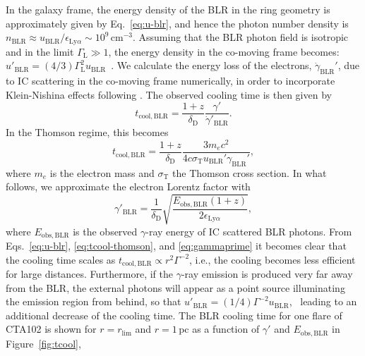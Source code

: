 \documentclass[twocolumn,linenumbers]{aastex62}
\newcommand{\gray}{$\gamma$-ray\xspace}
\begin{document}
In the galaxy frame, the energy density of the BLR in the ring geometry is approximately given by Eq.~\ref{eq:u-blr}, and hence the photon number density is $n_\mathrm{BLR} \approx u_\mathrm{BLR} / \epsilon_{\mathrm{Ly}\alpha}\sim10^{9}\,\mathrm{cm}^{-3}$.
Assuming that the BLR photon field is isotropic and in the limit $\Gamma_\mathrm{L} \gg 1$, the energy density in the co-moving frame becomes:
$u'_\mathrm{BLR} = (4/3)\Gamma_\mathrm{L}^2 u_\mathrm{BLR}$~\citep{1994ApJS...90..945D,2002ApJ...575..667D}.
We calculate the energy loss of the electrons, $\dot{\gamma}_\mathrm{BLR}'$, due to IC scattering in the co-moving frame numerically, in order to incorporate Klein-Nishina   effects following \citet{1970RvMP...42..237B}.
The observed cooling time is then given by
\begin{equation}
    t_\mathrm{cool,BLR} = \frac{1 + z}{\delta_\mathrm{D}} \frac{\gamma'}{\dot{\gamma}'_\mathrm{BLR}}.
    \label{eq:tcool}
\end{equation}
In the Thomson regime, this becomes
\begin{equation}
    t_\mathrm{cool,BLR} = \frac{1+z}{\delta_\mathrm{D}}\frac{3m_ec^2}{4c\sigma_\mathrm{T}u_\mathrm{BLR}'\gamma_\mathrm{BLR}'},
    \label{eq:tcool-thomson}
\end{equation}
where $m_e$ is the electron mass and $\sigma_\mathrm{T}$ the Thomson cross section. 
In what follows, we approximate the electron Lorentz factor with~\citep[e.g.,][]{2009herb.book.....D,finke2016}
\begin{equation}
    \gamma'_\mathrm{BLR} = \frac{1}{ \delta_\mathrm{D}}\sqrt{\frac{E_\mathrm{obs,BLR}(1+z)}{2\epsilon_{\mathrm{Ly}\alpha}}},
    \label{eq:gammaprime}
\end{equation}
where $E_\mathrm{obs,BLR}$ is the observed \gray energy of IC scattered BLR photons. 
From Eqs.~\ref{eq:u-blr}, \ref{eq:tcool-thomson}, and \ref{eq:gammaprime} it becomes clear that the cooling time scales as $t_\mathrm{cool, BLR}\propto r^2 \Gamma^{-2}$, i.e., the cooling becomes less efficient for large distances. 
Furthermore, if the \gray emission is produced very far away from the BLR, the external photons will appear as a point source illuminating the emission region from behind, so that $u'_\mathrm{BLR} = (1/4)\Gamma^{-2} u_\mathrm{BLR}$,~\citep{1994ApJS...90..945D} leading to an additional decrease of the cooling time. 
The BLR cooling time for one flare of CTA102 is shown for $r=r_\mathrm{lim}$ and $r = 1\,$pc as a function of $\gamma'$ and $E_\mathrm{obs,BLR}$ in Figure~\ref{fig:tcool},  
\end{document}
